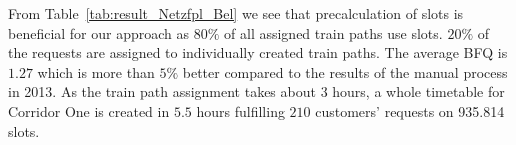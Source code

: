 From Table~\ref{tab:result_Netzfpl_Bel} we see that precalculation of slots is beneficial for our approach as $80\%$ of all assigned train paths use slots. $20\%$ of the requests are assigned to individually created train paths. The average BFQ is $1.27$ which is more than $5\%$ better compared to the results of the manual process in 2013. As the train path assignment takes about $3$ hours, a whole timetable for Corridor One is created in $5.5$ hours fulfilling $210$ customers' requests on 935.814 slots.